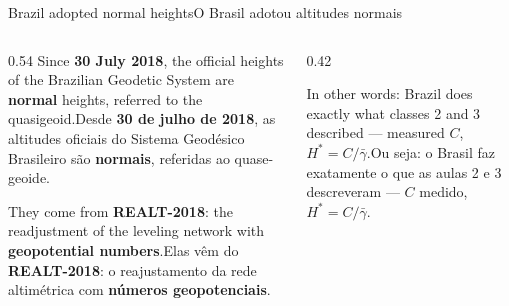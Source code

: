 \documentclass[aspectratio=169,11pt]{beamer}
\newcommand{\tr}[2]{\ifEN#2\else#1\fi}
\newcommand{\bnum}[1]{\textbf{\textcolor{mTeal}{#1}}}
\begin{document}
\begin{frame}{\tr{O Brasil adotou altitudes normais}{Brazil adopted normal heights}}
  \centering
  \bigskip

  \begin{columns}[T]
    \begin{column}{0.54\textwidth}
      \tr{Desde \bnum{30 de julho de 2018}, as altitudes oficiais do Sistema Geodésico
      Brasileiro são \bnum{normais}, referidas ao quase-geoide.}{Since \bnum{30 July 2018},
      the official heights of the Brazilian Geodetic System are \bnum{normal} heights,
      referred to the quasigeoid.}
      \medskip

      \tr{Elas vêm do \textbf{REALT-2018}: o reajustamento da rede altimétrica com
      \bnum{números geopotenciais}.}{They come from \textbf{REALT-2018}: the readjustment of
      the leveling network with \bnum{geopotential numbers}.}
    \end{column}
    \begin{column}{0.42\textwidth}
      \begin{ideia}
        \small\tr{Ou seja: o Brasil faz exatamente o que as aulas 2 e 3 descreveram ---
        $C$ medido, $H^{*} = C/\bar\gamma$.}{In other words: Brazil does exactly what classes 2
        and 3 described --- measured $C$, $H^{*} = C/\bar\gamma$.}
      \end{ideia}
    \end{column}
  \end{columns}
\end{frame}
\end{document}
